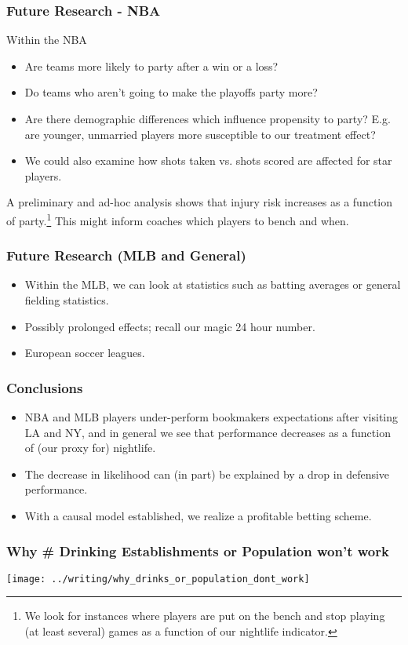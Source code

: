 \documentclass{beamer}
\begin{document}
\begin{frame}   \frametitle{Future Research - NBA}
  Within the NBA
  \begin{itemize}     
    \item Are teams more likely to party after a win or a       loss?
    \item Do teams who aren't going to make the playoffs party more?
    \item Are there demographic differences which influence propensity to party? E.g. are younger, unmarried players more susceptible to our treatment effect?
    \item We could also examine how shots taken vs. shots scored are affected for star players.
  \end{itemize}
  \vspace{12pt}  A preliminary and ad-hoc analysis shows that injury risk increases as a function of party.\footnote{We look for instances where players are put on the bench and stop playing (at least several) games as a function of our nightlife indicator.}
  This might inform coaches which players to bench and when.

\end{frame}

\begin{frame}   \frametitle{Future Research (MLB and General)}
  \begin{itemize}     
  \item Within the MLB, we can look at statistics such as batting averages or general fielding statistics. 
    \item Possibly prolonged effects; recall our magic 24 hour number.
    \item European soccer leagues.   \end{itemize} \end{frame}

\begin{frame}   \frametitle{Conclusions}
  \begin{itemize}     \item NBA and MLB players under-perform bookmakers expectations after visiting LA and NY, and in general we see that performance decreases as a function of (our proxy for) nightlife.
    \item The decrease in likelihood can (in part) be explained by a drop in defensive performance.
    \item With a causal model established, we realize a profitable betting scheme.   \end{itemize} \end{frame}

\begin{frame}   \frametitle{Why \# Drinking Establishments or Population won't work}
  \texttt{[image: ../writing/why\_drinks\_or\_population\_dont\_work]} \end{frame}
\end{document}
